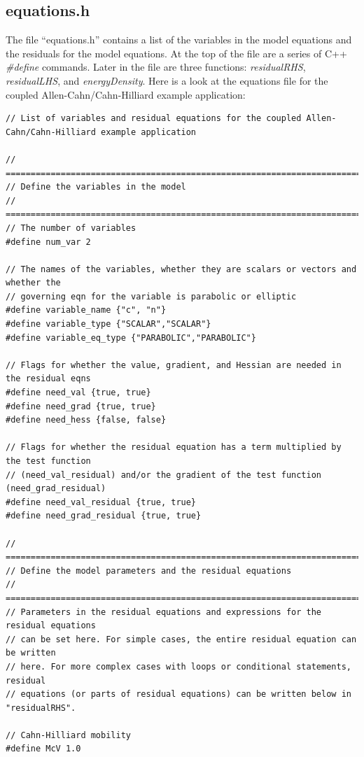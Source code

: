 \documentclass[10pt]{article} %
\begin{document}
\subsection{equations.h} \label{equations}
The file ``equations.h'' contains a list of the variables in the model equations and the residuals for the model equations. At the top of the file are a series of C++ \emph{\#define} commands. Later in the file are three functions: \emph{residualRHS}, \emph{residualLHS}, and \emph{energyDensity}. Here is a look at the equations file for the coupled Allen-Cahn/Cahn-Hilliard example application:
\tiny
\begin{lstlisting}
// List of variables and residual equations for the coupled Allen-Cahn/Cahn-Hilliard example application

// =================================================================================
// Define the variables in the model
// =================================================================================
// The number of variables
#define num_var 2

// The names of the variables, whether they are scalars or vectors and whether the
// governing eqn for the variable is parabolic or elliptic
#define variable_name {"c", "n"}
#define variable_type {"SCALAR","SCALAR"}
#define variable_eq_type {"PARABOLIC","PARABOLIC"}

// Flags for whether the value, gradient, and Hessian are needed in the residual eqns
#define need_val {true, true}
#define need_grad {true, true}
#define need_hess {false, false}

// Flags for whether the residual equation has a term multiplied by the test function
// (need_val_residual) and/or the gradient of the test function (need_grad_residual)
#define need_val_residual {true, true}
#define need_grad_residual {true, true}

// =================================================================================
// Define the model parameters and the residual equations
// =================================================================================
// Parameters in the residual equations and expressions for the residual equations
// can be set here. For simple cases, the entire residual equation can be written
// here. For more complex cases with loops or conditional statements, residual
// equations (or parts of residual equations) can be written below in "residualRHS".

// Cahn-Hilliard mobility
#define McV 1.0


\end{lstlisting}
\end{document}
